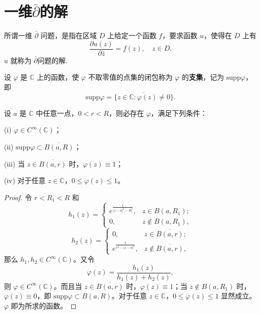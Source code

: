 \documentclass[../../main.tex]{subfiles}%
\begin{document}
\section{一维$\overline{\partial }$的解}

\begin{definition}
所谓一维 \( \bar{\partial} \) 问题，是指在区域 \( D \) 上给定一个函数 \( f \)，要求函数 \( u \)，使得在 \( D \) 上有
\[
\frac{\partial u(z)}{\partial \bar{z}} = f(z), \quad z \in D.
\]
\( u \) 就称为 \( \bar{\partial} \)问题的解.
\end{definition}

\begin{definition}
设 \( \varphi \) 是 \( \mathbb{C} \) 上的函数，使 \( \varphi \) 不取零值的点集的闭包称为 \( \varphi \) 的\textbf{支集}，记为 \( \text{supp}\varphi \)，即
\[
\text{supp}\varphi = \overline{\{ z \in \mathbb{C} : \varphi(z) \neq 0 \}}.
\]
\end{definition}

\begin{lemma}\label{lemma:引理3.7.2}
设 \( a \) 是 \( \mathbb{C} \) 中任意一点，\( 0 < r < R \)，则必存在 \( \varphi \)，满足下列条件：

(i) \( \varphi \in C^\infty(\mathbb{C}) \)；

(ii) \( \text{supp}\varphi \subset \overline{B(a,R)} \)；

(iii) 当 \( z \in \overline{B(a,r)} \) 时，\( \varphi(z) \equiv 1 \)；

(iv) 对于任意 \( z \in \mathbb{C} \)，\( 0 \leqslant \varphi(z) \leqslant 1 \)。
\end{lemma}
\begin{proof}

令 \( r < R_1 < R \) 和
\[
h_1(z) = \begin{cases} 
\displaystyle e^{\frac{1}{|z - a|^2 - R_1^2}}, & z \in B(a,R_1); \\
0, & z \notin B(a,R_1),
\end{cases}
\]
\[
h_2(z) = \begin{cases} 
0, & z \in \overline{B(a,r)}; \\
\displaystyle e^{\frac{1}{r^2 - |z - a|^2}}, & z \notin \overline{B(a,r)},
\end{cases}
\]
那么 \( h_1, h_2 \in C^\infty(\mathbb{C}) \)。又令
\[
\varphi(z) = \frac{h_1(z)}{h_1(z) + h_2(z)},
\]
则 \( \varphi \in C^\infty(\mathbb{C}) \)。而且当 \( z \in \overline{B(a,r)} \) 时，\( \varphi(z) \equiv 1 \)；当 \( z \notin B(a,R_1) \) 时，\( \varphi(z) \equiv 0 \)，即 \( \text{supp}\varphi \subset B(a,R) \)。对于任意 \( z \in \mathbb{C} \)，\( 0 \leqslant \varphi(z) \leqslant 1 \) 显然成立。\( \varphi \) 即为所求的函数。

\end{proof}
\end{document}

